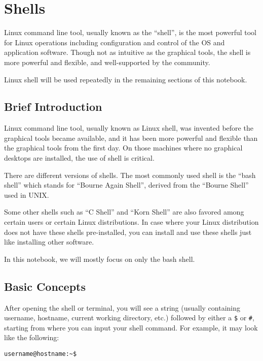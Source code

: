\chapter{Shells}

Linux command line tool, usually known as the ``shell'', is the most powerful tool for Linux operations including configuration and control of the OS and application software. Though not as intuitive as the graphical tools, the shell is more powerful and flexible, and well-supported by the community.

Linux shell will be used repeatedly in the remaining sections of this notebook.

\section{Brief Introduction}

Linux command line tool, usually known as Linux shell, was invented before the graphical tools became available, and it has been more powerful and flexible than the graphical tools from the first day. On those machines where no graphical desktops are installed, the use of shell is critical.

There are different versions of shells. The most commonly used shell is the ``bash shell'' which stands for ``Bourne Again Shell'', derived from the ``Bourne Shell'' used in UNIX.

Some other shells such as ``C Shell'' and ``Korn Shell'' are also favored among certain users or certain Linux distributions. In case where your Linux distribution does not have these shells pre-installed, you can install and use these shells just like installing other software.

In this notebook, we will mostly focus on only the bash shell.

\section{Basic Concepts}

After opening the shell or terminal, you will see a string (usually containing username, hostname, current working directory, etc.) followed by either a \verb|$| or \verb|#|, starting from where you can input your shell command. For example, it may look like the following:
\begin{verbatim}
username@hostname:~$
\end{verbatim}

